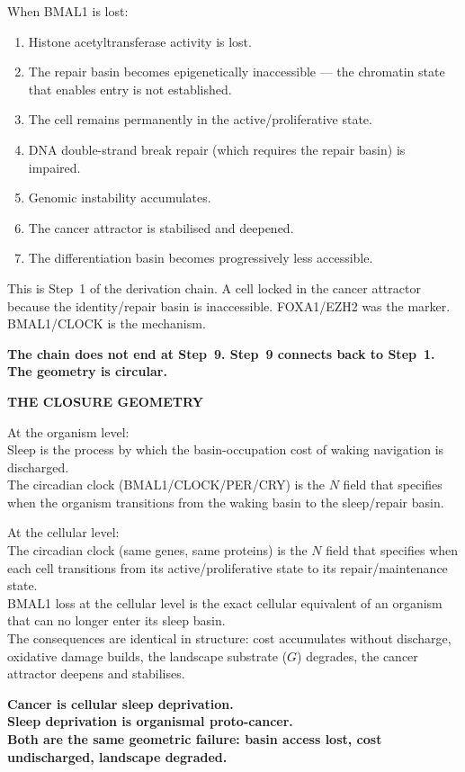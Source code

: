 \documentclass[10pt, a4paper]{article}
\begin{document}
When BMAL1 is lost:

\begin{enumerate}[itemsep=0.2em]
  \item Histone acetyltransferase
    activity is lost.
  \item The repair basin becomes
    epigenetically inaccessible ---
    the chromatin state that enables
    entry is not established.
  \item The cell remains permanently
    in the active/proliferative state.
  \item DNA double-strand break repair
    (which requires the repair basin)
    is impaired.
  \item Genomic instability accumulates.
  \item The cancer attractor is
    stabilised and deepened.
  \item The differentiation basin
    becomes progressively less
    accessible.
\end{enumerate}

This is Step~1 of the derivation chain.
A cell locked in the cancer attractor
because the identity/repair basin is
inaccessible. FOXA1/EZH2 was the
marker. BMAL1/CLOCK is the mechanism.

\textbf{The chain does not end at
Step~9. Step~9 connects back to
Step~1. The geometry is circular.}

\begin{mdframed}[backgroundcolor=closurebox,
  linecolor=headergreen,linewidth=0.8pt,
  innertopmargin=0.6em,innerbottommargin=0.6em,
  innerleftmargin=0.8em,innerrightmargin=0.8em]
\textbf{THE CLOSURE GEOMETRY}

\smallskip
At the organism level:\\
Sleep is the process by which the
basin-occupation cost of waking
navigation is discharged.\\
The circadian clock (BMAL1/CLOCK/PER/CRY)
is the $N$ field that specifies when
the organism transitions from the
waking basin to the sleep/repair basin.

\smallskip
At the cellular level:\\
The circadian clock (same genes,
same proteins) is the $N$ field that
specifies when each cell transitions
from its active/proliferative state
to its repair/maintenance state.\\
BMAL1 loss at the cellular level
is the exact cellular equivalent of
an organism that can no longer enter
its sleep basin.\\
The consequences are identical in
structure: cost accumulates without
discharge, oxidative damage builds,
the landscape substrate ($G$) degrades,
the cancer attractor deepens and
stabilises.

\smallskip
\textbf{Cancer is cellular sleep
deprivation.\\
Sleep deprivation is organismal
proto-cancer.\\
Both are the same geometric
failure: basin access lost,
cost undischarged, landscape
degraded.}
\end{mdframed}
\end{document}
